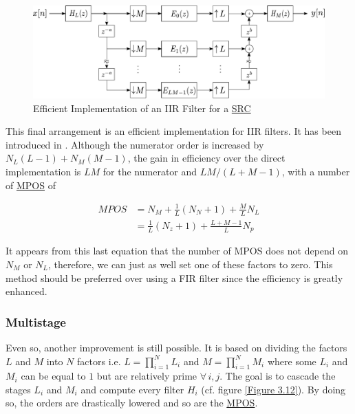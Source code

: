 \begin{figure}[ht!]
	\centering
	\includegraphics[scale = 0.7]{russell_final.pdf}
	\caption{Efficient Implementation of an IIR Filter for a \protect\hyperlink{SRC}{SRC}}
	\label{Figure 3.11}
\end{figure}


This final arrangement is an efficient implementation for IIR filters. It has been introduced in \cite{russell}. Although the numerator order is increased by $N_L(L-1) + N_M(M-1)$, the gain in efficiency over the direct implementation is $LM$ for the numerator and $LM/(L+M-1)$, with a number of \hyperlink{MPOS}{MPOS} of

\begin{equation}
	\begin{aligned}
	MPOS &= N_M + \frac{1}{L} (N_N+1) + \frac{M}{L} N_L \\
	&= \frac{1}{L} (N_z +1) + \frac{L+M-1}{L} N_p 
	\label{eqn:3.23}
	\end{aligned}
\end{equation}

It appears from this last equation that the number of MPOS does not depend on $N_M$ or $N_L$, therefore, we can just as well set one of these factors to zero. This method should be preferred over using a FIR filter since the efficiency is greatly enhanced. 


\subsubsection{Multistage}\label{3.1.4.2}

Even so, another improvement is still possible. It is based on dividing the factors $L$ and $M$ into $N$ factors i.e. $L = \prod_{i=1}^{N}L_i$ and $M=\prod_{i=1}^{N}M_i$ where some $L_i$ and $M_i$ can be equal to $1$ but are relatively prime $\forall \,  i,j$. The goal is to cascade the stages $L_i$ and $M_i$ and compute every filter $H_i$ (cf. figure \ref{Figure 3.12}). By doing so, the orders are drastically lowered and so are the \hyperlink{MPOS}{MPOS}. 

